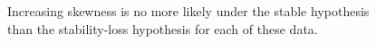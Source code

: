 \documentclass[authoryear, preprint,review,12pt]{elsarticle}
\begin{document}
\begin{figure}[ht]
\begin{center}
\end{center}
\caption{Increasing skewness is no more likely under the stable hypothesis than the stability-loss hypothesis for each of these data.}
\label{fig:1}
\end{figure}


\pagebreak

\section*{ }%

\end{document}
